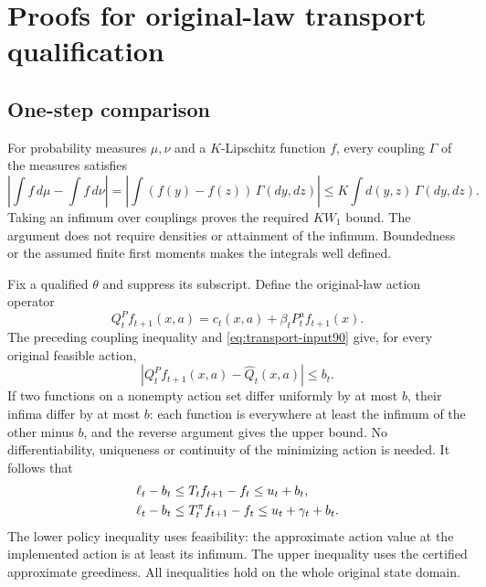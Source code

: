\section{Proofs for original-law transport qualification}\label{supp:transport90}
\subsection{One-step comparison}
For probability measures $\mu,\nu$ and a $K$-Lipschitz function $f$, every coupling $\Gamma$ of the measures satisfies
\[
 \left|\int f\,d\mu-\int f\,d\nu\right|
 =\left|\int(f(y)-f(z))\,\Gamma(dy,dz)\right|
 \le K\int d(y,z)\,\Gamma(dy,dz).
\]
Taking an infimum over couplings proves the required $K W_1$ bound. The argument does not require densities or attainment of the infimum. Boundedness or the assumed finite first moments makes the integrals well defined.

Fix a qualified $\theta$ and suppress its subscript. Define the original-law action operator
\[
 Q_t^P f_{t+1}(x,a)=c_t(x,a)+\beta_tP_t^a f_{t+1}(x).
\]
The preceding coupling inequality and \eqref{eq:transport-input90} give, for every original feasible action,
\begin{equation}\label{eq:one-step90}
 |Q_t^P f_{t+1}(x,a)-\widehat Q_t(x,a)|\le b_t.
\end{equation}
If two functions on a nonempty action set differ uniformly by at most $b$, their infima differ by at most $b$: each function is everywhere at least the infimum of the other minus $b$, and the reverse argument gives the upper bound. No differentiability, uniqueness or continuity of the minimizing action is needed. It follows that
\begin{align}\label{eq:true-residual90}
 \ell_t-b_t&\le T_t f_{t+1}-f_t\le u_t+b_t,\notag\\
 \ell_t-b_t&\le T_t^\pi f_{t+1}-f_t
                         \le u_t+\gamma_t+b_t.
\end{align}
The lower policy inequality uses feasibility: the approximate action value at the implemented action is at least its infimum. The upper inequality uses the certified approximate greediness. All inequalities hold on the whole original state domain.

